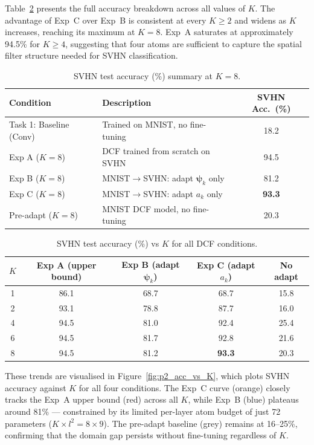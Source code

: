 \documentclass[11pt,letterpaper]{article}
\newcommand{\psivec}{\boldsymbol{\psi}}
\begin{document}
Table~\ref{tab:p2_vsK} presents the full accuracy breakdown across all
values of $K$.  The advantage of Exp~C over Exp~B is consistent at every
$K \ge 2$ and widens as $K$ increases, reaching its maximum at $K=8$.
Exp~A saturates at approximately 94.5\% for $K \ge 4$, suggesting that
four atoms are sufficient to capture the spatial filter structure needed
for SVHN classification.

\begin{table}[h]
\centering
\caption{SVHN test accuracy (\%) summary at $K=8$.}
\label{tab:p2_main}
\begin{tabular}{llc}
\toprule
Condition & Description & SVHN Acc.\ (\%) \\
\midrule
Task 1: Baseline (Conv) & Trained on MNIST, no fine-tuning & 18.2 \\
\midrule
Exp A ($K=8$) & DCF trained from scratch on SVHN & 94.5 \\
Exp B ($K=8$) & MNIST$\to$SVHN: adapt $\psivec_k$ only & 81.2 \\
Exp C ($K=8$) & MNIST$\to$SVHN: adapt $a_k$ only & \textbf{93.3} \\
Pre-adapt ($K=8$) & MNIST DCF model, no fine-tuning & 20.3 \\
\bottomrule
\end{tabular}
\end{table}

\begin{table}[h]
\centering
\caption{SVHN test accuracy (\%) vs $K$ for all DCF conditions.}
\label{tab:p2_vsK}
\begin{tabular}{c cccc}
\toprule
$K$ & Exp A (upper bound) & Exp B (adapt $\psivec_k$) &
      Exp C (adapt $a_k$) & No adapt \\
\midrule
1 & 86.1 & 68.7 & 68.7 & 15.8 \\
2 & 93.1 & 78.8 & 87.7 & 16.0 \\
4 & 94.5 & 81.0 & 92.4 & 25.4 \\
6 & 94.5 & 81.7 & 92.8 & 21.6 \\
8 & 94.5 & 81.2 & \textbf{93.3} & 20.3 \\
\bottomrule
\end{tabular}
\end{table}

These trends are visualised in Figure~\ref{fig:p2_acc_vs_K}, which
plots SVHN accuracy against $K$ for all four conditions.  The Exp~C curve
(orange) closely tracks the Exp~A upper bound (red) across all $K$, while
Exp~B (blue) plateaus around 81\% --- constrained by its limited
per-layer atom budget of just 72 parameters ($K \times l^2 = 8 \times 9$).
The pre-adapt baseline (grey) remains at 16--25\%, confirming that the
domain gap persists without fine-tuning regardless of $K$.
\end{document}
